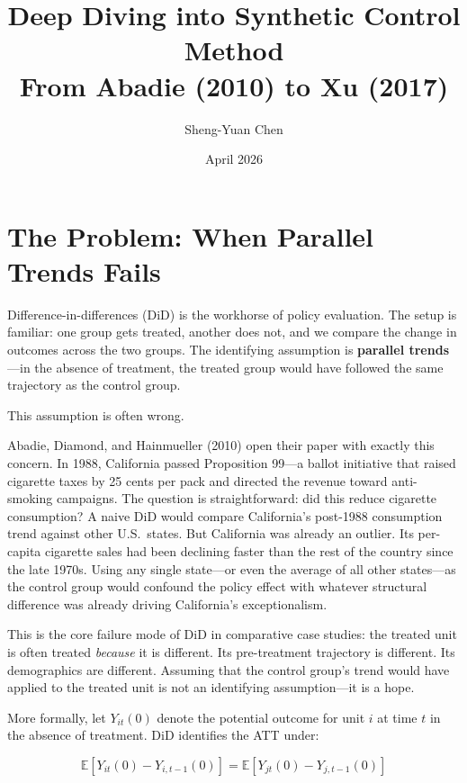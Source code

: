 \documentclass[12pt]{article}
\title{\textbf{Deep Diving into Synthetic Control Method}\\
\large From Abadie (2010) to Xu (2017)}
\author{Sheng-Yuan Chen}
\date{April 2026}
\newcommand{\E}{\mathbb{E}}
\begin{document}
\maketitle
\tableofcontents
\newpage

\section{The Problem: When Parallel Trends Fails}

Difference-in-differences (DiD) is the workhorse of policy evaluation.
The setup is familiar: one group gets treated, another does not,
and we compare the change in outcomes across the two groups.
The identifying assumption is \textbf{parallel trends}---in the absence of treatment,
the treated group would have followed the same trajectory as the control group.

This assumption is often wrong.

Abadie, Diamond, and Hainmueller (2010) open their paper with exactly this concern.
In 1988, California passed Proposition 99---a ballot initiative that raised cigarette taxes
by 25 cents per pack and directed the revenue toward anti-smoking campaigns.
The question is straightforward: did this reduce cigarette consumption?
A naive DiD would compare California's post-1988 consumption trend against other U.S.\ states.
But California was already an outlier.
Its per-capita cigarette sales had been declining faster than the rest of the country
since the late 1970s.
Using any single state---or even the average of all other states---as the control group
would confound the policy effect with whatever structural difference was already driving
California's exceptionalism.

This is the core failure mode of DiD in comparative case studies:
the treated unit is often treated \emph{because} it is different.
Its pre-treatment trajectory is different.
Its demographics are different.
Assuming that the control group's trend would have applied to the treated unit
is not an identifying assumption---it is a hope.

More formally, let $Y_{it}(0)$ denote the potential outcome for unit $i$ at time $t$
in the absence of treatment.
DiD identifies the ATT under:

\begin{equation}
  \E[Y_{it}(0) - Y_{i,t-1}(0)] = \E[Y_{jt}(0) - Y_{j,t-1}(0)]
\end{equation}
\end{document}
